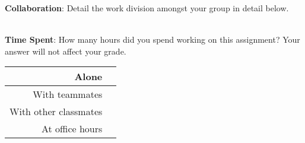 \documentclass[12pt]{article}
\begin{document}
\textbf{Collaboration}: Detail the work division amongst your group in detail below.

\begin{tcolorbox}[fit,height=10em, width=40em, blank, borderline={1pt}{1pt},nobeforeafter]
            \begin{center}
            \end{center}
            \end{tcolorbox}\\

\noindent\textbf{Time Spent}: How many hours did you spend working on this assignment? Your answer will not affect your grade.

\begin{tcolorbox}[fit,height=10em, width=40em, blank, borderline={1pt}{1pt},nobeforeafter]
\begin{table}[H]
    \centering
    \begin{tabular}{r|c}
        Alone &  \hspace{3em} %
        \\ \hline
        With teammates & \hspace{3em} %
        \\ \hline
        With other classmates & \hspace{3em} %
        \\ \hline
        At office hours & \hspace{3em} %
        \\ \hline
    \end{tabular}
\end{table}
\end{tcolorbox}
\end{document}
